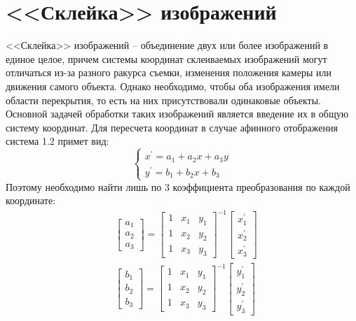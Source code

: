 \documentclass[a4paper, 16pt]{article}
\begin{document}
\section{<<Склейка>> изображений}
\noindent <<Склейка>> изображений -- объединение двух или более
изображений в единое целое, причем системы координат склеиваемых
изображений могут отличаться из-за разного ракурса съемки, изменения
положения камеры или движения самого объекта. Однако необходимо, чтобы
оба изображения имели области перекрытия, то есть на них присутствовали
одинаковые объекты. Основной задачей обработки таких изображений является
введение их в общую систему координат. Для пересчета координат в случае 
афинного отображения система 1.2 примет вид:
$$
\begin{cases}
    x^{\prime}=a_1+a_2x+a_3y\\
    y^{\prime}=b_1+b_2x+b_3
\end{cases}
$$
\noindent Поэтому необходимо найти лишь по 3 коэффициента преобразования по каждой координате:
\begin{align*}
    &\begin{bmatrix}
        a_1\\
        a_2\\
        a_3
    \end{bmatrix}=
    \begin{bmatrix}
        1 &x_1 & y_1\\
        1 &x_2 &y_2\\
        1 &x_3 &y_3
    \end{bmatrix}^{-1}
    \begin{bmatrix}
        x_1^{\prime}\\
        x_2^{\prime}\\
        x_3^{\prime}
    \end{bmatrix}\\
    &\begin{bmatrix}
        b_1\\
        b_2\\
        b_3
    \end{bmatrix}=
    \begin{bmatrix}
        1 &x_1 & y_1\\
        1 &x_2 &y_2\\
        1 &x_3 &y_3
    \end{bmatrix}^{-1}
    \begin{bmatrix}
        y_1^{\prime}\\
        y_2^{\prime}\\
        y_3^{\prime}
    \end{bmatrix}
\end{align*}
\end{document}
